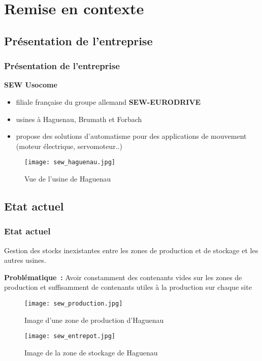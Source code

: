 \section{Remise en contexte}
\subsection{Pr{\'e}sentation de l'entreprise}
\begin{frame}
  \frametitle{Pr{\'e}sentation de l'entreprise}
  \textbf{SEW Usocome}

  \begin{minipage}{.5\textwidth}
  \begin{itemize}
  \item filiale fran{\c c}aise du groupe allemand \textbf{SEW-EURODRIVE}
  \item usines {\`a} Haguenau, Brumath et Forbach
  \item propose des solutions d'automatisme pour des applications de
    mouvement (moteur {\'e}lectrique, servomoteur..)
  \end{itemize}
\end{minipage}%
\begin{minipage}{.5\textwidth}
  \begin{figure}
    \centering
    \texttt{[image: sew\_haguenau.jpg]}
    \caption{Vue de l'usine de Haguenau}
    \label{fig:sew_haguenau}
  \end{figure}
\end{minipage}
\end{frame}
%
\subsection{Etat actuel}
\begin{frame}
  \frametitle{Etat actuel}

  Gestion des stocks inexistantes entre les zones de production et de
  stockage et les autres usines.

  \textbf{Probl{\'e}matique~:} Avoir constamment des contenants vides sur
  les zones de production et suffisamment de contenants utiles {\`a} la
  production sur chaque site

  \begin{minipage}{.5\textwidth}
    \begin{figure}
      \centering
      \texttt{[image: sew\_production.jpg]}
      \caption{Image d'une zone de production d'Haguenau}
      \label{fig:sew_production}
    \end{figure}
  \end{minipage}%
  \begin{minipage}{.5\textwidth}
    \begin{figure}
      \centering
      \texttt{[image: sew\_entrepot.jpg]}
      \caption{Image de la zone de stockage de Haguenau}
      \label{fig:sew_entrepot}
    \end{figure}
  \end{minipage}
\end{frame}%
